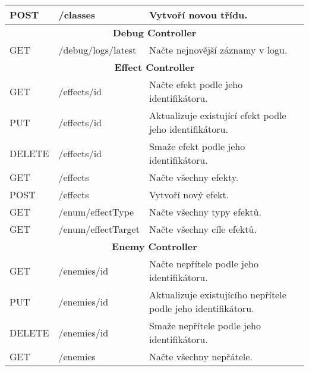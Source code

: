 \begin{longtable}{|l|l|p{}|}
    POST            & /classes                    & Vytvoří novou třídu.                                                \\
    \hline
    \multicolumn{3}{|c|}{\textbf{Debug Controller}}                                                                     \\
    \hline
    GET             & /debug/logs/latest          & Načte nejnovější záznamy v logu.                                    \\
    \hline
    \multicolumn{3}{|c|}{\textbf{Effect Controller}}                                                                    \\
    \hline
    GET             & /effects/{id}               & Načte efekt podle jeho identifikátoru.                              \\
    PUT             & /effects/{id}               & Aktualizuje existující efekt podle jeho identifikátoru.             \\
    DELETE          & /effects/{id}               & Smaže efekt podle jeho identifikátoru.                              \\
    GET             & /effects                    & Načte všechny efekty.                                               \\
    POST            & /effects                    & Vytvoří nový efekt.                                                 \\
    GET             & /enum/effectType            & Načte všechny typy efektů.                                          \\
    GET             & /enum/effectTarget          & Načte všechny cíle efektů.                                          \\
    \hline
    \multicolumn{3}{|c|}{\textbf{Enemy Controller}}                                                                     \\
    \hline
    GET             & /enemies/{id}               & Načte nepřítele podle jeho identifikátoru.                          \\
    PUT             & /enemies/{id}               & Aktualizuje existujícího nepřítele podle jeho identifikátoru.       \\
    DELETE          & /enemies/{id}               & Smaže nepřítele podle jeho identifikátoru.                          \\
    GET             & /enemies                    & Načte všechny nepřátele.                                            \\

\end{longtable}
